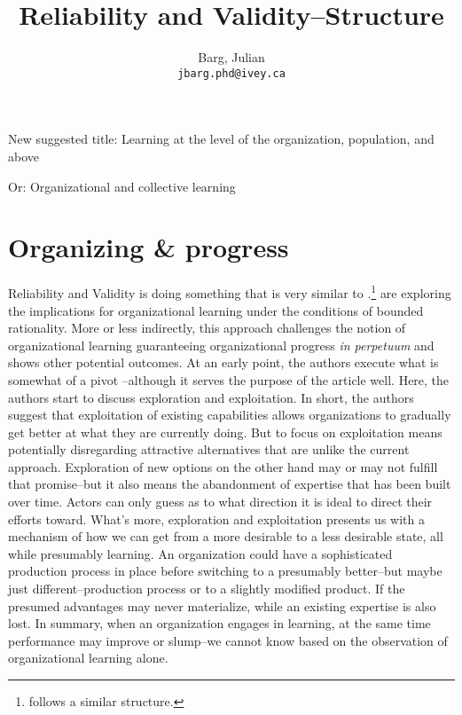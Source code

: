 \documentclass{article}
\title{Reliability and Validity--Structure}
\author{
	Barg, Julian\\
	\texttt{jbarg.phd@ivey.ca}
}
\begin{document}
	\maketitle

	New suggested title: Learning at the level of the organization, population, and above

	Or: Organizational and collective learning

	\section*{Organizing \& progress}

	Reliability and Validity is doing something that is very similar to \citet{Levinthal1993}.\footnote{\citet{March1991a} follows a similar structure.} \citeauthor{Levinthal1993} are exploring the implications for organizational learning under the conditions of bounded rationality. More or less indirectly, this approach challenges the notion of organizational learning guaranteeing organizational progress \textit{in perpetuum} and shows other potential outcomes. At an early point, the authors execute what is somewhat of a pivot \citep[p. 97]{Levinthal1993}--although it serves the purpose of the article well. Here, the authors start to discuss exploration and exploitation. In short, the authors suggest that exploitation of existing capabilities allows organizations to gradually get better at what they are currently doing. But to focus on exploitation means potentially disregarding attractive alternatives that are unlike the current approach. Exploration of new options on the other hand may or may not fulfill that promise--but it also means the abandonment of expertise that has been built over time. Actors can only guess as to what direction it is ideal to direct their efforts toward. What's more, exploration and exploitation presents us with a mechanism of how we can get from a more desirable to a less desirable state, all while presumably learning. An organization could have a sophisticated production process in place before switching to a presumably better--but maybe just different--production process or to a slightly modified product. If the presumed advantages may never materialize, while an existing expertise is also lost. In summary, when an organization engages in learning, at the same time performance may improve or slump--we cannot know based on the observation of organizational learning alone.
\end{document}
